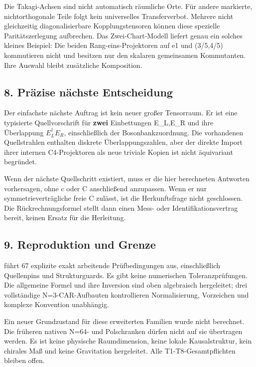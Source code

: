 Die Takagi-Achsen sind nicht automatisch räumliche Orte. Für andere
markierte, nichtorthogonale Teile folgt kein universelles
Transferverbot. Mehrere nicht gleichzeitig diagonalisierbare
Kopplungstensoren können diese spezielle Paritätszerlegung aufbrechen.
Das Zwei-Chart-Modell liefert genau ein solches kleines Beispiel: Die
beiden Rang-eins-Projektoren auf e1 und (3/5,4/5) kommutieren nicht und
besitzen nur den skalaren gemeinsamen Kommutanten. Ihre Auswahl bleibt
zusätzliche Komposition.

\subsection{8. Präzise nächste
Entscheidung}\label{pruxe4zise-nuxe4chste-entscheidung}

Der einfachste nächste Auftrag ist kein neuer großer Tensorraum. Er ist
eine typisierte Quellvorschrift für \textbf{zwei} Einbettungen E\_L,E\_R
und ihre Überlappung \(E_L^\dagger E_R\), einschließlich der
Bosonbankzuordnung. Die vorhandenen Quellstrahlen enthalten diskrete
Überlappungszahlen, aber der direkte Import ihrer internen
C4-Projektoren als neue triviale Kopien ist nicht äquivariant begründet.

Wenn der nächste Quellschritt existiert, muss er die hier berechneten
Antworten vorhersagen, ohne c oder C anschließend anzupassen. Wenn er
nur symmetrieverträgliche freie C zulässt, ist die Herkunftsfrage nicht
geschlossen. Die Rückrechnungsformel stellt dann einen Mess- oder
Identifikationsvertrag bereit, keinen Ersatz für die Herleitung.

\subsection{9. Reproduktion und Grenze}\label{reproduktion-und-grenze}

 führt 67 explizite exakt arbeitende
Prüfbedingungen aus, einschließlich Quellenpins und Strukturguards. Es
gibt keine numerischen Toleranzprüfungen. Die allgemeine Formel und ihre
Inversion sind oben algebraisch hergeleitet; drei vollständige
N=3-CAR-Aufbauten kontrollieren Normalisierung, Vorzeichen und komplexe
Konvention unabhängig.

Ein neuer Grundzustand für diese erweiterten Familien wurde nicht
berechnet. Die früheren nativen N=64- und Polschranken dürfen nicht auf
sie übertragen werden. Es ist keine physische Raumdimension, keine
lokale Kausalstruktur, kein chirales Maß und keine Gravitation
hergeleitet. Alle T1-T8-Gesamtpflichten bleiben offen.

